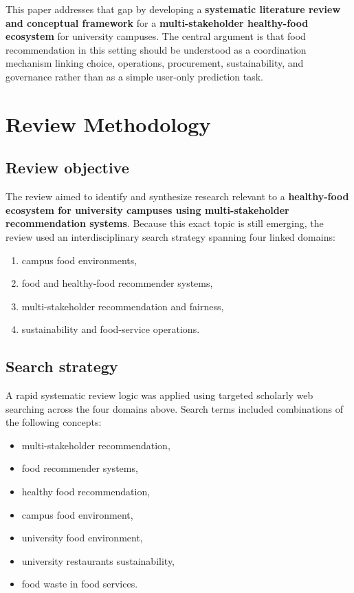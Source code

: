 \documentclass[journal]{IEEEtran}
\begin{document}
This paper addresses that gap by developing a \textbf{systematic
literature review and conceptual framework} for a
\textbf{multi-stakeholder healthy-food ecosystem} for university
campuses. The central argument is that food recommendation in this
setting should be understood as a coordination mechanism linking choice,
operations, procurement, sustainability, and governance rather than as a
simple user-only prediction task.

\section{Review Methodology}\label{review-methodology}

\subsection{Review objective}\label{review-objective}

The review aimed to identify and synthesize research relevant to a
\textbf{healthy-food ecosystem for university campuses using
multi-stakeholder recommendation systems}. Because this exact topic is
still emerging, the review used an interdisciplinary search strategy
spanning four linked domains:

\begin{enumerate}
\def\labelenumi{\arabic{enumi}.}
\tightlist
\item
  campus food environments,
\item
  food and healthy-food recommender systems,
\item
  multi-stakeholder recommendation and fairness,
\item
  sustainability and food-service operations.
\end{enumerate}

\subsection{Search strategy}\label{search-strategy}

A rapid systematic review logic was applied using targeted scholarly web
searching across the four domains above. Search terms included
combinations of the following concepts:

\begin{itemize}
\tightlist
\item
  multi-stakeholder recommendation,
\item
  food recommender systems,
\item
  healthy food recommendation,
\item
  campus food environment,
\item
  university food environment,
\item
  university restaurants sustainability,
\item
  food waste in food services.
\end{itemize}
\end{document}
